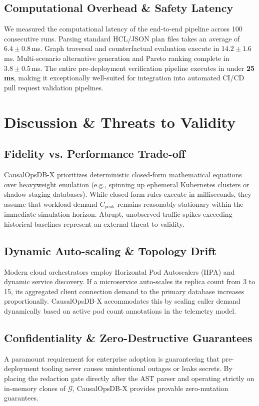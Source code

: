 \documentclass[conference]{IEEEtran}
\begin{document}
\subsection{Computational Overhead \& Safety Latency}
We measured the computational latency of the end-to-end pipeline across 100 consecutive runs. Parsing standard HCL/JSON plan files takes an average of $6.4 \pm 0.8$\,ms. Graph traversal and counterfactual evaluation execute in $14.2 \pm 1.6$\,ms. Multi-scenario alternative generation and Pareto ranking complete in $3.8 \pm 0.5$\,ms. The entire pre-deployment verification pipeline executes in under \textbf{25\,ms}, making it exceptionally well-suited for integration into automated CI/CD pull request validation pipelines.

\section{Discussion \& Threats to Validity}
\subsection{Fidelity vs. Performance Trade-off}
CausalOpsDB-X prioritizes deterministic closed-form mathematical equations over heavyweight emulation (e.g., spinning up ephemeral Kubernetes clusters or shadow staging databases). While closed-form rules execute in milliseconds, they assume that workload demand $C_{\text{peak}}$ remains reasonably stationary within the immediate simulation horizon. Abrupt, unobserved traffic spikes exceeding historical baselines represent an external threat to validity.

\subsection{Dynamic Auto-scaling \& Topology Drift}
Modern cloud orchestrators employ Horizontal Pod Autoscalers (HPA) and dynamic service discovery. If a microservice auto-scales its replica count from 3 to 15, its aggregated client connection demand to the primary database increases proportionally. CausalOpsDB-X accommodates this by scaling caller demand dynamically based on active pod count annotations in the telemetry model.

\subsection{Confidentiality \& Zero-Destructive Guarantees}
A paramount requirement for enterprise adoption is guaranteeing that pre-deployment tooling never causes unintentional outages or leaks secrets. By placing the redaction gate directly after the AST parser and operating strictly on in-memory clones of $\mathcal{G}$, CausalOpsDB-X provides provable zero-mutation guarantees.
\end{document}
